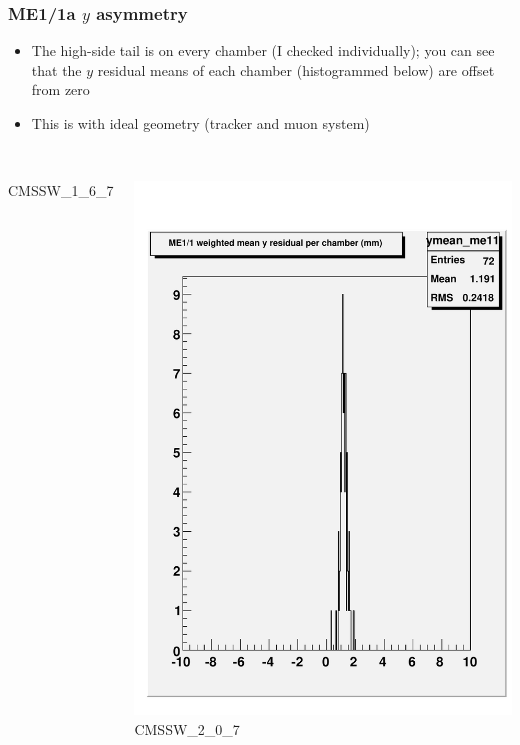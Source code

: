 \documentclass[compress]{beamer}
\begin{document}
\begin{frame}
\frametitle{ME1/1a $y$ asymmetry}
\small

\begin{itemize}
\item The high-side tail is on every chamber (I checked individually);
you can see that the $y$ residual means of each chamber (histogrammed
below) are offset from zero
\item This is with ideal geometry (tracker and muon system)
\end{itemize}

\begin{columns}
\mbox{ } \hfill CMSSW\_1\_6\_7

\mbox{ } \hfill \includegraphics[width=0.7\linewidth]{talk_me11_ymean_167.pdf}
CMSSW\_2\_0\_7


\end{columns}
\end{frame}
\end{document}
